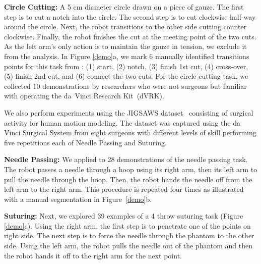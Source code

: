 \vspace{0.5em}

\noindent\textbf{Circle Cutting: }
A 5 cm diameter circle drawn on a piece of gauze.
The first step is to cut a notch into the circle.
The second step is to cut clockwise half-way around the circle.
Next, the robot transitions to the other side cutting counter clockwise.
Finally, the robot finishes the cut at the meeting point of the two cuts.
As the left arm's only action is to maintain the gauze in tension, we exclude it from the analysis. 
In Figure \ref{demo}a, we mark 6 manually identified transitions points for this task from \cite{murali2015learning}: (1) start, (2) notch, (3) finish 1st cut, (4) cross-over, (5) finish 2nd cut, and (6) connect the two cuts.
For the circle cutting task, we collected 10 demonstrations by researchers who were not surgeons but familiar with operating the da~Vinci Research Kit~(dVRK).

\vspace{0.5em}
We also perform experiments using the JIGSAWS dataset~\cite{gao2014jigsaws} consisting of surgical activity for human motion modeling. The dataset was captured using the da Vinci Surgical System from eight surgeons with different levels of skill performing five repetitions each of Needle Passing and Suturing.

\vspace{0.5em}

\noindent\textbf{Needle Passing: } We applied \tsc to 28 demonstrations of the needle passing task.
The robot passes a needle through a hoop using its right arm, then its left arm to pull the needle through the hoop. Then, the robot hands the needle off from the left arm to the right arm. This procedure is repeated four times as illustrated with a manual segmentation in Figure~\ref{demo}b.

\vspace{0.5em}

\noindent\textbf{Suturing: }Next, we explored 39 examples of a 4 throw suturing task (Figure \ref{demo}c). Using the right arm, the first step is to penetrate one of the points on right side. The next step is to force the needle through the phantom to the other side. Using the left arm, the robot pulls the needle out of the phantom and then the robot hands it off to the right arm for the next point. 


